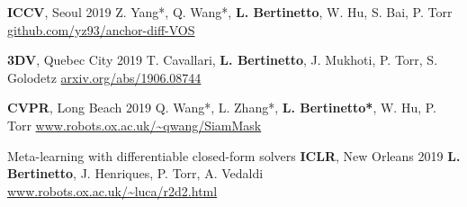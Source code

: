 \begin{cvpapers}
    {\textbf{ICCV}, Seoul} %
    {2019} %
  \cvpaperauthors
    {Z. Yang*, Q. Wang*, \textbf{L. Bertinetto}, W. Hu, S. Bai, P. Torr}
    {} %
    {} %
  \cvpaperurl
    {\href{https://github.com/yz93/anchor-diff-VOS}{github.com/yz93/anchor-diff-VOS}}
    {} %
    {} %

    {\textbf{3DV}, Quebec City} %
    {2019} %
  \cvpaperauthors
    {T. Cavallari, \textbf{L. Bertinetto}, J. Mukhoti, P. Torr, S. Golodetz}
    {} %
    {} %
  \cvpaperurl
    {\href{https://arxiv.org/abs/1906.08744}{arxiv.org/abs/1906.08744}}
    {} %
    {} %

    {\textbf{CVPR}, Long Beach} %
    {2019} %
  \cvpaperauthors
    {Q. Wang*, L. Zhang*, \textbf{L. Bertinetto*}, W. Hu, P. Torr}
    {} %
    {} %
  \cvpaperurl
    {\href{http://www.robots.ox.ac.uk/~qwang/SiamMask/}{www.robots.ox.ac.uk/\textasciitilde qwang/SiamMask}}
    {} %
    {} %

  \cvpapertitle
    {Meta-learning with differentiable closed-form solvers} %
    {\textbf{ICLR}, New Orleans} %
    {2019} %
  \cvpaperauthors
    {\textbf{L. Bertinetto}, J. Henriques, P. Torr, A. Vedaldi}
    {} %
    {} %
  \cvpaperurl
    {\href{http://www.robots.ox.ac.uk/~luca/r2d2.html}{www.robots.ox.ac.uk/\textasciitilde luca/r2d2.html}}
    {} %
    {} %


\end{cvpapers}
